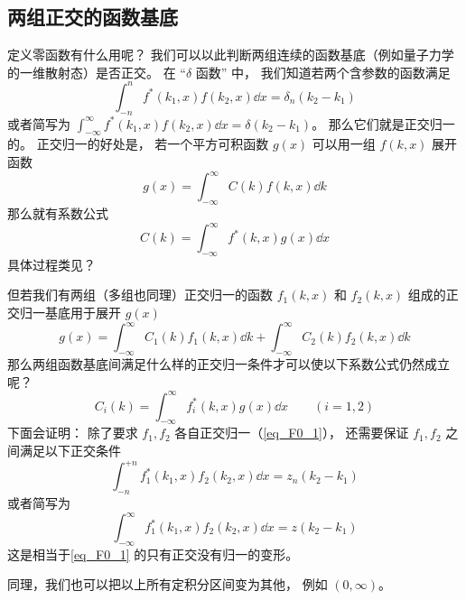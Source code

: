 \subsection{两组正交的函数基底}
定义零函数有什么用呢？ 我们可以以此判断两组连续的函数基底（例如量子力学的一维散射态）是否正交。 在 “$\delta$ 函数” 中， 我们知道若两个含参数的函数满足
\begin{equation}\label{eq_F0_1}
\int_{-n}^{n} f^*(k_1, x) f(k_2, x)\dd{x} = \delta_n(k_2 - k_1)
\end{equation}
或者简写为 $\int_{-\infty}^{\infty} f^*(k_1, x) f(k_2, x)\dd{x} = \delta(k_2 - k_1)$。 那么它们就是正交归一的。 正交归一的好处是， 若一个平方可积函数 $g(x)$ 可以用一组 $f(k, x)$ 展开函数
\begin{equation}
g(x) = \int_{-\infty}^{\infty} C(k) f(k, x) \dd{k}
\end{equation}
那么就有系数公式
\begin{equation}
C(k) = \int_{-\infty}^{\infty} f^*(k, x)g(x)\dd{x}
\end{equation}
具体过程类见？

但若我们有两组（多组也同理）正交归一的函数 $f_1(k, x)$ 和 $f_2(k, x)$ 组成的正交归一基底用于展开 $g(x)$
\begin{equation}\label{eq_F0_3}
g(x) = \int_{-\infty}^{\infty} C_1(k) f_1(k, x) \dd{k} + \int_{-\infty}^{\infty} C_2(k) f_2(k, x) \dd{k}
\end{equation}
那么两组函数基底间满足什么样的正交归一条件才可以使以下系数公式仍然成立呢？
\begin{equation}\label{eq_F0_4}
C_i(k) = \int_{-\infty}^{\infty} f_i^*(k, x)g(x)\dd{x} \qquad (i = 1,2)
\end{equation}
下面会证明： 除了要求 $f_1, f_2$ 各自正交归一（\autoref{eq_F0_1}）， 还需要保证 $f_1, f_2$ 之间满足以下正交条件
\begin{equation}
\int_{-n}^{+n} f_1^*(k_1, x) f_2(k_2, x) \dd{x} = z_n(k_2 - k_1)
\end{equation}
或者简写为
\begin{equation}
\int_{-\infty}^{\infty} f_1^*(k_1, x) f_2(k_2, x) \dd{x} = z(k_2 - k_1)
\end{equation}
这是相当于\autoref{eq_F0_1} 的只有正交没有归一的变形。

同理，我们也可以把以上所有定积分区间变为其他， 例如 $(0, \infty)$。

